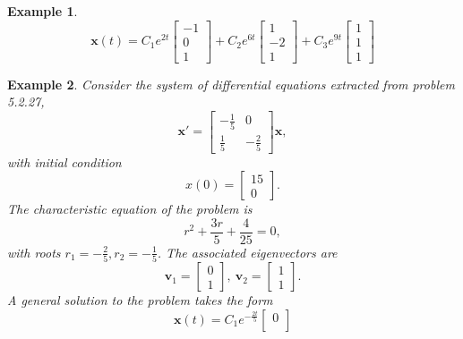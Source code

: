 \documentclass[11pt]{amsart}
\newtheorem{example}{Example}
\numberwithin{equation}{section}
\begin{document}
\begin{example}
\begin{equation*}
\mathbf{x}(t)=C_1e^{2t}
\begin{bmatrix}
-1 \\
0 \\
1
\end{bmatrix}
+C_2e^{6t}
\begin{bmatrix}
1 \\
-2 \\
1
\end{bmatrix}
+C_3e^{9t}
\begin{bmatrix}
1 \\
1 \\
1
\end{bmatrix}
\end{equation*}
\end{example}

\begin{example}
Consider the system of differential equations extracted from problem 5.2.27,
\begin{equation*}
\mathbf{x}' = 
\begin{bmatrix}
-\frac{1}{5} & 0 \\
\frac{1}{5} & -\frac{2}{5}
\end{bmatrix}
\mathbf{x},
\end{equation*}
with initial condition 
\begin{equation*}
x(0)=
\begin{bmatrix}
15 \\
0
\end{bmatrix}.
\end{equation*}
The characteristic equation of the problem is 
\begin{equation*}
r^2+\frac{3r}{5}+\frac{4}{25} = 0,
\end{equation*}
with roots $r_1=-\frac{2}{5}, r_2=-\frac{1}{5}$. The associated eigenvectors are 
\begin{equation*}
\mathbf{v}_1 =
\begin{bmatrix}
0 \\
1
\end{bmatrix}, \ \mathbf{v}_2 =
\begin{bmatrix}
1 \\
1
\end{bmatrix}.
\end{equation*}
A general solution to the problem takes the form
\begin{equation*}
\mathbf{x}(t)=C_1e^{-\frac{2t}{5}}
\begin{bmatrix}
0\\

\end{bmatrix}
\end{equation*}
\end{example}
\end{document}
